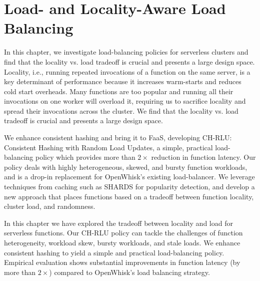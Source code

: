 \chapter{Load- and Locality-Aware Load Balancing}
\label{chap:chrlu}

In this chapter, we investigate load-balancing policies for serverless clusters and find that the locality vs. load tradeoff is crucial and presents a large design space.
Locality, i.e., running repeated invocations of a function on the same server, is a key determinant of performance because it increases warm-starts and reduces cold start overheads.
Many functions are too popular and running all their invocations on one worker will overload it, requiring us to sacrifice locality and spread their invocations across the cluster.
We find that the locality vs. load tradeoff is crucial and presents a large design space. 

We enhance consistent hashing and bring it to FaaS, developing CH-RLU: Consistent Hashing with Random Load Updates, a simple, practical load-balancing policy which provides more than $2\times$ reduction in function latency. 
Our policy deals with highly heterogeneous, skewed, and bursty function workloads, and is a drop-in replacement for OpenWhisk's existing load-balancer.
We leverage techniques from caching such as SHARDS for popularity detection, and develop a new approach that places functions based on a tradeoff between function locality, cluster load, and randomness. 





















In this chapter we have explored the tradeoff between locality and load for serverless functions. 
Our CH-RLU policy can tackle the challenges of function heterogeneity, workload skew, bursty workloads, and stale loads.
We enhance consistent hashing to yield a simple and practical load-balancing policy. 
Empirical evaluation shows substantial improvements in function latency (by more than $2\times$) compared to OpenWhisk's load balancing strategy.


